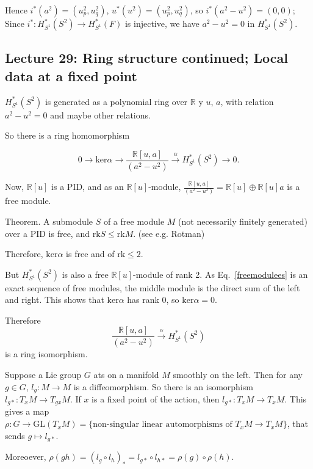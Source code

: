\documentclass{article}
\theoremstyle{mystyle}
\theoremstyle{remark}
\numberwithin{equation}{section}
\begin{document}
Hence $i^*(a^2) = (u_p^2,u_q^2)$, $u^*(u^2) = (u_p^2,u_q^2)$, so $i^*(a^2-u^2) = (0,0)$; Since $i^*\colon H^*_{S^1}(S^2)\rightarrow H^*_{S^1}(F)$ is injective, we have $a^2-u^2=0$ in $H^*_{S^1}(S^2)$. 


\subsection{Lecture 29: Ring structure continued; Local data at a fixed point}

$H^*_{S^1}(S^2)$ is generated as a polynomial ring over $\mathbb{R}$ y $u$, $a$, with relation $a^2-u^2=0$ and maybe other relations.

So there is a ring homomorphism

\begin{equation}\label{freemodulees}
0\rightarrow \mathrm{ker}\alpha \rightarrow \frac{\mathbb{R}[u,a]}{(a^2-u^2)}\xrightarrow{\alpha} H^*_{S^1}(S^2)\rightarrow 0.
\end{equation}

Now, $\mathbb{R}[u]$ is a PID, and as an $\mathbb{R}[u]$-module, $\frac{\mathbb{R}[u,a]}{(a^2-u^2)} = \mathbb{R}[u]\oplus \mathbb{R}[u]a$ is a free module.

Theorem. A submodule $S$ of a free module $M$ (not necessarily finitely generated) over a PID is free, and $\mathrm{rk}S \leq \mathrm{rk}M$. (see e.g. Rotman)


Therefore, $\mathrm{ker} \alpha$ is free and of $\mathrm{rk}\leq 2$. 

But $H^*_{S^1}(S^2)$ is also a free $\mathbb{R}[u]$-module of rank 2. As Eq.~\eqref{freemodulees} is an exact sequence of free modules, the middle module is the direct sum of the left and right. This shows that $\mathrm{ker}\alpha$ has rank $0$, so $\mathrm{ker}\alpha=0$. 

Therefore 
$$\frac{\mathbb{R}[u,a]}{(a^2-u^2)}\xrightarrow{\alpha} H^*_{S^1}(S^2)$$ 
is a ring isomorphism.



Suppose a Lie group $G$ ats on a manifold $M$ smoothly on the left. Then for any $g\in G$, $l_g\colon M\rightarrow M$ is a diffeomorphism. So there is an isomorphism $l_{g*}\colon T_xM\rightarrow T_{gx}M$. If $x$ is a fixed point of the action, then $l_{g*}\colon T_xM\rightarrow T_xM$. This gives a map $\rho\colon G\rightarrow \mathrm{GL}(T_xM)= \{\text{non-singular linear automorphisms of }T_xM\rightarrow T_xM\}$, that sends $g\mapsto l_{g*}$.

Moreoever, $\rho(gh) = (l_g\circ l_h)_* = l_{g*}\circ l_{h*} = \rho(g)\circ \rho(h)$. 
\end{document}
